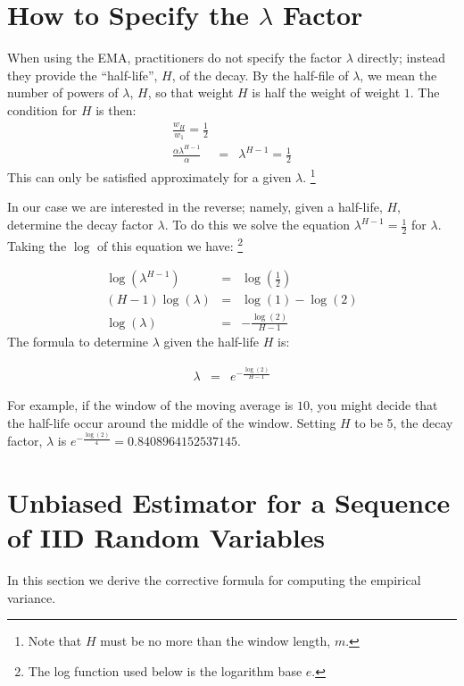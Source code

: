\documentclass{article}
\begin{document}
\section{How to Specify the $\lambda$ Factor}
When using the EMA, practitioners do not specify the factor $\lambda$ directly; 
instead they provide the ``half-life'', $H$,  of the decay.
By the half-file of $\lambda$, we mean the number of powers of $\lambda$, $H$, so that
weight $H$ is half the weight of weight $1$. The condition for $H$ is then:
\begin{eqnarray}
	\frac{w_H}{w_1} = \frac{1}{2} \\
	\frac{\alpha \lambda^{H-1}}{\alpha} &=& \lambda^{H-1} = \frac{1}{2}
\end{eqnarray}
This can only be satisfied approximately for a given $\lambda$. 
\footnote{Note that $H$ must be no more than the window length, $m$.} 

In our case we are interested in the reverse; namely, given a half-life, $H$, 
determine the decay factor $\lambda$. To do this we solve the equation $\lambda^{H-1} = \frac{1}{2}$
for $\lambda$.
Taking the $\log$ of this equation we have:%
\footnote{The log function used below is the logarithm base $e$.}

\begin{eqnarray*}
	\log(\lambda^{H-1}) &=&  \log\left(\frac{1}{2}\right) \\
	(H-1) \log(\lambda) &=& \log(1) - \log(2)  \\
    \log(\lambda)   &=& -\frac{\log(2)}{H-1} 
\end{eqnarray*}
The formula to determine $\lambda$ given the half-life $H$ is:

\begin{eqnarray}
    \lambda &=& e^{-\frac{\log(2)}{H-1}}
\end{eqnarray}

For example, if the window of the moving average is $10$, you might decide that the 
half-life occur around the middle of the window. Setting $H$ to be 5, the decay factor, $\lambda$ 
is $e^{-\frac{\log(2)}{4}} = 0.8408964152537145$.

\eject

\appendix

\section{Unbiased Estimator for a Sequence of IID Random Variables}
In this section we derive the corrective formula for computing the empirical variance.
\end{document}
